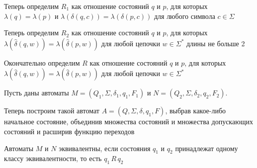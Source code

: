 \documentclass[12pt]{article}
\begin{document}
\begin{enumerate}
        Теперь определим $R_1$ как отношение состояний $q$ и $p$, для которых $\lambda(q) = \lambda(p)$ и $\lambda(\delta(q, c)) = \lambda(\delta(p, c))$ для любого символа $c \in \Sigma$

        Теперь определим $R_2$ как отношение состояний $q$ и $p$, для которых $\lambda(\hat\delta(q, w)) = \lambda(\hat\delta(p, w))$ для любой цепочки $w \in \Sigma^*$ длины не больше 2

        Окончательно определим $R$ как отношение состояний $q$ и $p$, для которых $\lambda(\hat\delta(q, w)) = \lambda(\hat\delta(p, w))$ для любой цепочки $w \in \Sigma^*$


        \begin{minipage}{\linewidth}
            \begin{figure}

            \end{figure}

            Пусть даны автоматы $M = (Q_1, \Sigma, \delta_1, q_1, F_1)$ и $N = (Q_2, \Sigma, \delta_2, q_2, F_2)$.

            Теперь построим такой автомат $A = (Q, \Sigma, \delta, q_1, F)$, выбрав какое-либо начальное состояние, объединив множества состояний и множества допускающих состояний и расширив функцию переходов

            Автоматы $M$ и $N$ эквивалентны, если состояния $q_1$ и $q_2$ принадлежат одному классу эквивалентности, то есть $q_1 \, R \, q_2$


\end{minipage}
\end{enumerate}
\end{document}
